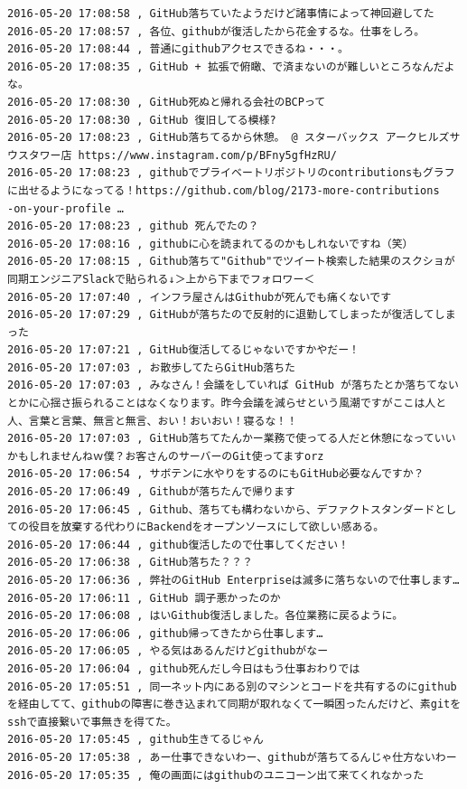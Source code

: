 \begin{verbatim}
2016-05-20 17:08:58 , GitHub落ちていたようだけど諸事情によって神回避してた
2016-05-20 17:08:57 , 各位、githubが復活したから花金するな。仕事をしろ。
2016-05-20 17:08:44 , 普通にgithubアクセスできるね・・・。
2016-05-20 17:08:35 , GitHub + 拡張で俯瞰、で済まないのが難しいところなんだよな。
2016-05-20 17:08:30 , GitHub死ぬと帰れる会社のBCPって
2016-05-20 17:08:30 , GitHub 復旧してる模様?
2016-05-20 17:08:23 , GitHub落ちてるから休憩。 @ スターバックス アークヒルズサウスタワー店 https://www.instagram.com/p/BFny5gfHzRU/ 
2016-05-20 17:08:23 , githubでプライベートリポジトリのcontributionsもグラフに出せるようになってる！https://github.com/blog/2173-more-contributions
-on-your-profile …
2016-05-20 17:08:23 , github 死んでたの？
2016-05-20 17:08:16 , githubに心を読まれてるのかもしれないですね（笑）
2016-05-20 17:08:15 , Github落ちて"Github"でツイート検索した結果のスクショが同期エンジニアSlackで貼られる↓＞上から下までフォロワー＜
2016-05-20 17:07:40 , インフラ屋さんはGithubが死んでも痛くないです
2016-05-20 17:07:29 , GitHubが落ちたので反射的に退勤してしまったが復活してしまった
2016-05-20 17:07:21 , GitHub復活してるじゃないですかやだー！
2016-05-20 17:07:03 , お散歩してたらGitHub落ちた
2016-05-20 17:07:03 , みなさん！会議をしていれば GitHub が落ちたとか落ちてないとかに心揺さ振られることはなくなります。昨今会議を減らせという風潮ですがここは人と人、言葉と言葉、無言と無言、おい！おいおい！寝るな！！
2016-05-20 17:07:03 , GitHub落ちてたんかー業務で使ってる人だと休憩になっていいかもしれませんねｗ僕？お客さんのサーバーのGit使ってますorz
2016-05-20 17:06:54 , サボテンに水やりをするのにもGitHub必要なんですか？
2016-05-20 17:06:49 , Githubが落ちたんで帰ります
2016-05-20 17:06:45 , Github、落ちても構わないから、デファクトスタンダードとしての役目を放棄する代わりにBackendをオープンソースにして欲しい感ある。
2016-05-20 17:06:44 , github復活したので仕事してください！
2016-05-20 17:06:38 , GitHub落ちた？？？
2016-05-20 17:06:36 , 弊社のGitHub Enterpriseは滅多に落ちないので仕事します…
2016-05-20 17:06:11 , GitHub 調子悪かったのか
2016-05-20 17:06:08 , はいGithub復活しました。各位業務に戻るように。
2016-05-20 17:06:06 , github帰ってきたから仕事します…
2016-05-20 17:06:05 , やる気はあるんだけどgithubがなー
2016-05-20 17:06:04 , github死んだし今日はもう仕事おわりでは
2016-05-20 17:05:51 , 同一ネット内にある別のマシンとコードを共有するのにgithubを経由してて、githubの障害に巻き込まれて同期が取れなくて一瞬困ったんだけど、素gitをsshで直接繋いで事無きを得てた。
2016-05-20 17:05:45 , github生きてるじゃん
2016-05-20 17:05:38 , あー仕事できないわー、githubが落ちてるんじゃ仕方ないわー
2016-05-20 17:05:35 , 俺の画面にはgithubのユニコーン出て来てくれなかった

\end{verbatim}
